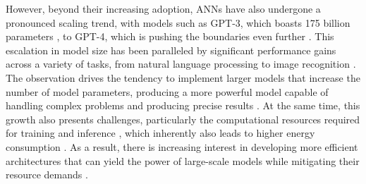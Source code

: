 
{However, beyond their increasing adoption, ANNs have also undergone a pronounced scaling trend, with models such as GPT-3, which boasts 175 billion parameters \cite{Brown2020Language}, to GPT-4, which is pushing the boundaries even further \cite{OpenAI2023GPT4}. This escalation in model size has been paralleled by significant performance gains across a variety of tasks, from natural language processing to image recognition \cite{katz2019marabou, amir2021smt}. The observation drives the tendency to implement larger models that increase the number of model parameters, producing a more powerful model capable of handling complex problems and producing precise results \cite{dantasComprehensiveReviewModel2024}. At the same time, this growth also presents challenges, particularly the computational resources required for training and inference \cite{amir2021smt, sena2021verifying}, which inherently also leads to higher energy consumption \cite{gholami2021surveyquantizationmethodsefficient}. As a result, there is increasing interest in developing more efficient architectures that can yield the power of large-scale models while mitigating their resource demands \cite{gholami2021surveyquantizationmethodsefficient,dantasComprehensiveReviewModel2024}.}



